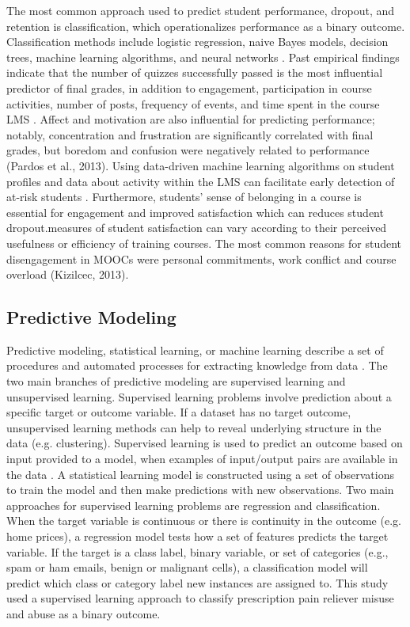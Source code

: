 \documentclass[sigconf]{acmart}
\begin{document}
The most common approach used to predict student performance, dropout, and 
retention is classification, which operationalizes performance as a binary 
outcome. Classification methods include logistic regression, naive Bayes 
models, decision trees, machine learning algorithms, and neural networks 
\cite{Lykourentzou09}. Past empirical findings indicate that the number of 
quizzes successfully passed is the most influential predictor of final grades, 
in addition to engagement, participation in course activities, number of posts, 
frequency of events, and time spent in the course LMS 
\cite{Papamitsiou14, romerozaldivar12}. Affect and motivation are also 
influential for predicting performance; notably, concentration and 
frustration are significantly correlated with final grades, but boredom and 
confusion were negatively related to performance (Pardos et al., 2013). 
Using data-driven machine learning algorithms on student profiles and data 
about activity within the LMS can facilitate early detection of at-risk 
students \cite{Dekkar09}. Furthermore, students’ sense of belonging in a 
course is essential for engagement and improved satisfaction which can 
reduces student dropout.measures of student satisfaction can vary according 
to their perceived usefulness or efficiency of training courses. The most 
common reasons for  student disengagement in MOOCs were personal commitments, 
work conflict and course overload (Kizilcec, 2013). 


\subsection{Predictive Modeling}

Predictive modeling, statistical learning, or machine learning describe a 
set of procedures and automated processes for extracting knowledge from 
data \cite{james13, kuhn13, muller17, raschka17}. The two main branches 
of predictive modeling are supervised learning and unsupervised learning. 
Supervised learning problems involve prediction about a specific target 
or outcome variable. If a dataset has no target outcome, unsupervised 
learning methods can help to reveal underlying structure in the data 
(e.g. clustering). Supervised learning is used to predict an outcome based 
on input provided to a model, when examples of input/output pairs are 
available in the data \cite{muller17}. A statistical learning model is 
constructed using a set of observations to train the model and then make
predictions with new observations. Two main approaches for supervised learning 
problems are regression and classification. When the target variable
is continuous or there is continuity in the outcome (e.g. home prices), a 
regression model tests how a set of features predicts the target variable. 
If the target is a class label, binary variable, or set of categories 
(e.g., spam or ham emails, benign or malignant cells), a classification model 
will predict which class or category label new instances are assigned to. 
This study used a supervised learning approach to classify prescription pain
reliever misuse and abuse as a binary outcome. 
\end{document}

